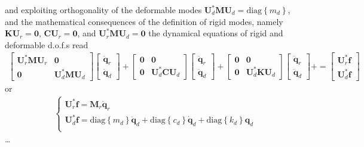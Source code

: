\documentclass[letterpaper,10pt,english]{jupyterBook}
\begin{document}
\sphinxAtStartPar
and exploiting orthogonality of the deformable modes \(\mathbf{U}_d^* \mathbf{M} \mathbf{U}_d = \text{diag}\left\{ m_d \right\}\), and the mathematical consequences of the definition of rigid modes, namely \(\mathbf{K} \mathbf{U}_r = \mathbf{0}\), \(\mathbf{C} \mathbf{U}_r = \mathbf{0}\), and \(\mathbf{U}_r^* \mathbf{M} \mathbf{U}_d = \mathbf{0}\) the dynamical equations of rigid and deformable d.o.f.s read
\begin{equation*}
\begin{split}
\begin{bmatrix} \mathbf{U}_r^* \mathbf{M} \mathbf{U}_r & \mathbf{0} \\ \mathbf{0} & \mathbf{U}_d^* \mathbf{M} \mathbf{U}_d \end{bmatrix} \begin{bmatrix} \ddot{\mathbf{q}}_r \\ \ddot{\mathbf{q}}_d \end{bmatrix} + 
\begin{bmatrix} \mathbf{0}                             & \mathbf{0} \\ \mathbf{0} & \mathbf{U}_d^* \mathbf{C} \mathbf{U}_d \end{bmatrix} \begin{bmatrix} \ddot{\mathbf{q}}_r \\ \ddot{\mathbf{q}}_d \end{bmatrix} + 
\begin{bmatrix} \mathbf{0}                             & \mathbf{0} \\ \mathbf{0} & \mathbf{U}_d^* \mathbf{K} \mathbf{U}_d \end{bmatrix} \begin{bmatrix} \ddot{\mathbf{q}}_r \\ \ddot{\mathbf{q}}_d \end{bmatrix} + 
= \begin{bmatrix} \mathbf{U}_r^* \mathbf{f} \\ \mathbf{U}_d^* \mathbf{f} \end{bmatrix}\end{split}
\end{equation*}
\sphinxAtStartPar
or
\begin{equation*}
\begin{split}\begin{cases}
  \mathbf{U}^*_r \mathbf{f} = \mathbf{M}_r \ddot{\mathbf{q}}_r \\
  \mathbf{U}^*_d \mathbf{f} = \text{diag}\left\{ m_d \right\} \ddot{\mathbf{q}}_d + \text{diag}\left\{ c_d \right\} \dot{\mathbf{q}}_d + \text{diag}\left\{ k_d \right\} \mathbf{q}_d \\
\end{cases}\end{split}
\end{equation*}
\sphinxAtStartPar
…
\end{document}
